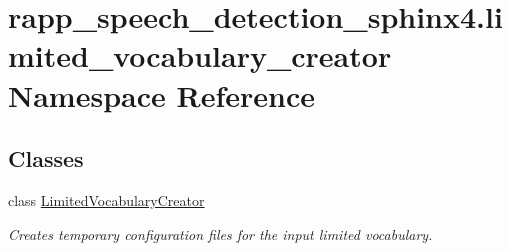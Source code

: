 \hypertarget{namespacerapp__speech__detection__sphinx4_1_1limited__vocabulary__creator}{\section{rapp\-\_\-speech\-\_\-detection\-\_\-sphinx4.\-limited\-\_\-vocabulary\-\_\-creator Namespace Reference}
\label{namespacerapp__speech__detection__sphinx4_1_1limited__vocabulary__creator}
}
\subsection*{Classes}
\begin{DoxyCompactItemize}
\item 
class \hyperlink{classrapp__speech__detection__sphinx4_1_1limited__vocabulary__creator_1_1LimitedVocabularyCreator}{Limited\-Vocabulary\-Creator}
\begin{DoxyCompactList}\small\item\em Creates temporary configuration files for the input limited vocabulary. \end{DoxyCompactList}\end{DoxyCompactItemize}
